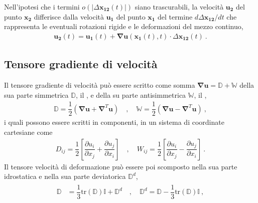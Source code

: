 \documentclass[letterpaper,10pt,italian]{jupyterBook}
\begin{document}
\sphinxAtStartPar
Nell’ipotesi che i termini \(o(|\Delta \mathbf{x_{12}}(t)|)\) siano
trascurabili, la velocità \(\mathbf{u_2}\) del punto \(\mathbf{x_2}\) differisce
dalla velocità \(\mathbf{u_1}\) del punto \(\mathbf{x_1}\) del termine
\(d \Delta\mathbf{x_{12}}/d t\) che rappresenta le eventuali rotazioni rigide
e le deformazioni del mezzo continuo,
\begin{equation*}
\begin{split}\label{eqn:cin:relative-vel-1}
 \mathbf{u_2}(t) = \mathbf{u_1}(t) + \mathbf{\nabla}\mathbf{u}\left(\mathbf{x_1}(t),t\right) \cdot \Delta\mathbf{x_{12}}(t) \ .\end{split}
\end{equation*}

\subsection{Tensore gradiente di velocità}
\label{\detokenize{polimi/fluidmechanics-ita/template/capitoli/03_cinematica/12teoria:tensore-gradiente-di-velocita}}
\sphinxAtStartPar
Il tensore gradiente di velocità può essere scritto come somma
\(\mathbf{\nabla}\mathbf{u} = \mathbb{D} + \mathbb{W}\) della sua parte simmetrica
\(\mathbb{D}\), il , e della su parte
antisimmetrica \(\mathbb{W}\), il ,
\begin{equation*}
\begin{split}\mathbb{D} = \dfrac{1}{2}\left(\mathbf{\nabla} \mathbf{u} + \mathbf{\nabla}^T \mathbf{u}\right)
  \quad , \quad 
  \mathbb{W} = \dfrac{1}{2}\left(\mathbf{\nabla} \mathbf{u} - \mathbf{\nabla}^T \mathbf{u}\right) \ ,\end{split}
\end{equation*}
\sphinxAtStartPar
i quali possono essere scritti in componenti, in un sistema di
coordinate cartesiane come
\begin{equation*}
\begin{split}D_{ij} = \dfrac{1}{2}\left[ \dfrac{\partial u_i}{\partial x_j} + \dfrac{\partial u_j}{\partial x_i} \right] \quad , \quad 
  W_{ij} = \dfrac{1}{2}\left[ \dfrac{\partial u_i}{\partial x_j} - \dfrac{\partial u_j}{\partial x_i} \right] \ .\end{split}
\end{equation*}
\sphinxAtStartPar
Il tensore velocità di deformazione può essere poi scomposto nella sua
parte idrostatica e nella sua parte deviatorica \(\mathbb{D}^d\),
\begin{equation*}
\begin{split}\begin{aligned}
  \mathbb{D} & = \dfrac{1}{3} \text{tr}(\mathbb{D}) \mathbb{I} + \mathbb{D}^d \quad , \quad
   \mathbb{D}^d = \mathbb{D} - \dfrac{1}{3} \text{tr}(\mathbb{D}) \mathbb{I} \ ,
 \end{aligned}\end{split}
\end{equation*}
\end{document}
